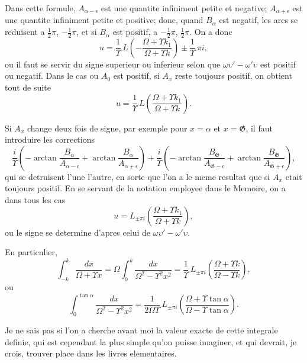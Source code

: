 \documentclass[11pt,a4paper]{book}
\begin{document}
Dans cette formule, $A_{\alpha-\epsilon}$ est une quantite infiniment petite et negative; $A_{\alpha+\epsilon}$ est
une quantite infiniment petite et positive; donc, quand $B_{\alpha}$ est negatif, les arcs se
reduisent a $\frac{1}{2}\pi$, $-\frac{1}{2}\pi$, et si $B_{\alpha}$ est positif, a $-\frac{1}{2}\pi$, $\frac{1}{2}\pi$. On a donc
\begin{equation}
u = \frac{1}{\Upsilon}\, L\left(-\frac{\Omega + \Upsilon k_1}{\Omega + \Upsilon k}\right) \pm \frac{1}{\Upsilon}\, \pi i, \tag{60}
\end{equation}
ou il faut se servir du signe superieur ou inferieur selon que $\omega\upsilon' - \omega'\upsilon$ est positif ou
negatif. Dans le cas ou $A_0$ est positif, si $A_x$ reste toujours positif, on obtient tout de
suite
\begin{equation}
u = \frac{1}{\Upsilon}\, L\left(\frac{\Omega + \Upsilon k_1}{\Omega + \Upsilon k}\right). \tag{61}
\end{equation}

Si $A_x$ change deux fois de signe, par exemple pour $x = \alpha$ et $x = \mathfrak{G}$, il faut introduire
les corrections
\[\frac{i}{\Upsilon}\left(-\arctan \frac{B_{\alpha}}{A_{\alpha-\epsilon}} + \arctan \frac{B_{\alpha}}{A_{\alpha+\epsilon}}\right)
+ \frac{i}{\Upsilon}\left(-\arctan \frac{B_{\mathfrak{G}}}{A_{\mathfrak{G}-\epsilon}} + \arctan \frac{B_{\mathfrak{G}}}{A_{\mathfrak{G}+\epsilon}}\right),\]
qui se detruisent l'une l'autre, en sorte que l'on a le meme resultat que si $A_x$ etait
toujours positif. En se servant de la notation employee dans le Memoire, on a dans
tous les cas
\begin{equation}
u = L_{\pm\pi i}\left(\frac{\Omega + \Upsilon k_1}{\Omega + \Upsilon k}\right), \tag{62}
\end{equation}
ou le signe se determine d'apres celui de $\omega\upsilon' - \omega'\upsilon$.

En particulier,
\[\int_{-k}^k \frac{dx}{\Omega + \Upsilon x} = \Omega \int_0^k \frac{dx}{\Omega^2 - \Upsilon^2 x^2}
= \frac{1}{\Upsilon}\, L_{\pm\pi i}\left(\frac{\Omega + \Upsilon k}{\Omega - \Upsilon k}\right),\]
ou
\begin{equation}
\int_0^{\tan\alpha} \frac{dx}{\Omega^2 - \Upsilon^2 x^2} = \frac{1}{2\Omega\Upsilon}\, L_{\pm\pi i}\left(\frac{\Omega + \Upsilon\tan\alpha}{\Omega - \Upsilon\tan\alpha}\right). \tag{63}
\end{equation}

Je ne sais pas si l'on a cherche avant moi la valeur exacte de cette integrale definie,
qui est cependant la plus simple qu'on puisse imaginer, et qui devrait, je crois, trouver
place dans les livres elementaires.
\end{document}
